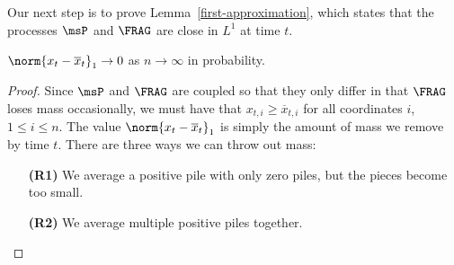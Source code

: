 \documentclass[12pt]{article}
\begin{document}
Our next step is to prove Lemma~\ref{first-approximation}, which states that the processes $\msP$ and $\FRAG$ are close in $L^1$ at time $t$.  
\begin{lem} \label{first-approximation}
	$\norm{x_t - \overline{x}_t}_1 \to 0$ as $n \to \infty$ in probability. 
\end{lem}

\begin{proof}
	Since $\msP$ and $\FRAG$ are coupled so that they only differ in that $\FRAG$ loses mass occasionally, we must have that $x_{t, i} \geq \overline{x}_{t, i}$ for all coordinates $i$, $1 \leq i \leq n$. The value $\norm{x_t - \overline{x}_t}_1$ is simply the amount of mass we remove by time $t$. There are three ways we can throw out mass:
	\begin{enumerate}
		\item[\textbf{(R1)}] We average a positive pile with only zero piles, but the pieces become too small. 

		\item[\textbf{(R2)}] We average multiple positive piles together. 


\end{enumerate}
\end{proof}
\end{document}

